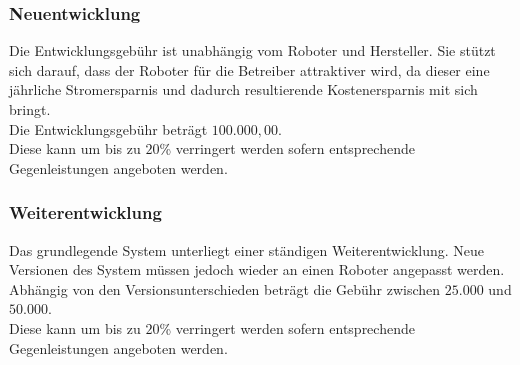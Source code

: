 \subsubsection{Neuentwicklung}
Die Entwicklungsgebühr ist unabhängig vom Roboter und Hersteller. Sie stützt sich darauf, dass der Roboter für die Betreiber attraktiver wird, da dieser eine jährliche Stromersparnis und dadurch resultierende Kostenersparnis mit sich bringt.\\
Die Entwicklungsgebühr beträgt $100.000,00$\officialeuro.\\
Diese kann um bis zu $20$\% verringert werden sofern entsprechende Gegenleistungen angeboten werden.

\subsubsection{Weiterentwicklung}
Das grundlegende System unterliegt einer ständigen Weiterentwicklung. Neue Versionen des System müssen jedoch wieder an einen Roboter angepasst werden. Abhängig von den Versionsunterschieden beträgt die Gebühr zwischen $25.000$ und $50.000$\officialeuro.\\
Diese kann um bis zu $20$\% verringert werden sofern entsprechende Gegenleistungen angeboten werden.

